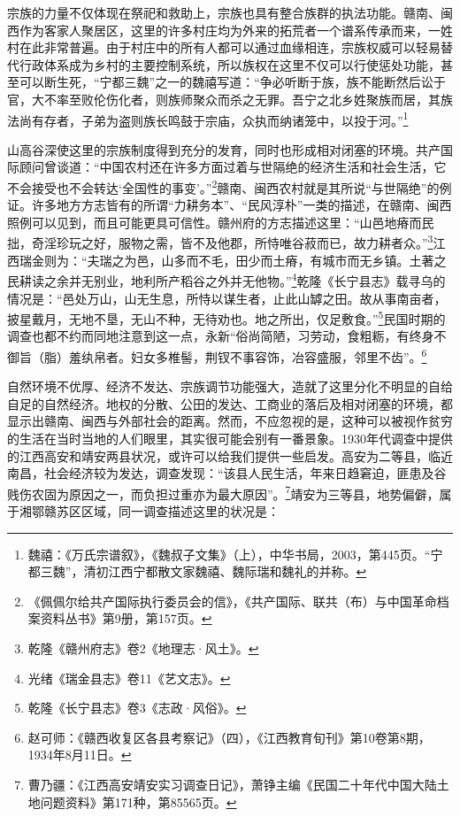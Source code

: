 宗族的力量不仅体现在祭祀和救助上，宗族也具有整合族群的执法功能。赣南、闽西作为客家人聚居区，这里的许多村庄均为外来的拓荒者一个谱系传承而来，一姓村在此非常普遍。由于村庄中的所有人都可以通过血缘相连，宗族权威可以轻易替代行政体系成为乡村的主要控制系统，所以族权在这里不仅可以行使惩处功能，甚至可以断生死，“宁都三魏”之一的魏禧写道：“争必听断于族，族不能断然后讼于官，大不率至败伦伤化者，则族师聚众而杀之无罪。吾宁之北乡姓聚族而居，其族法尚有存者，子弟为盗则族长鸣鼓于宗庙，众执而纳诸笼中，以投于河。”\footnote{魏禧：《万氏宗谱叙》，《魏叔子文集》（上），中华书局，2003，第445页。“宁都三魏”，清初江西宁都散文家魏禧、魏际瑞和魏礼的并称。}


山高谷深使这里的宗族制度得到充分的发育，同时也形成相对闭塞的环境。共产国际顾问曾谈道：“中国农村还在许多方面过着与世隔绝的经济生活和社会生活，它不会接受也不会转达‘全国性的事变’。”\footnote{《佩佩尔给共产国际执行委员会的信》，《共产国际、联共（布）与中国革命档案资料丛书》第9册，第157页。}赣南、闽西农村就是其所说“与世隔绝”的例证。许多地方方志皆有的所谓“力耕务本”、“民风淳朴”一类的描述，在赣南、闽西照例可以见到，而且可能更具可信性。赣州府的方志描述这里：“山邑地瘠而民拙，奇淫珍玩之好，服物之需，皆不及他郡，所恃唯谷菽而已，故力耕者众。”\footnote{乾隆《赣州府志》卷2《地理志·风土》。}江西瑞金则为：“夫瑞之为邑，山多而不毛，田少而土瘠，有城市而无乡镇。土著之民耕读之余并无别业，地利所产稻谷之外并无他物。”\footnote{光绪《瑞金县志》卷11《艺文志》。}乾隆《长宁县志》载寻乌的情况是：“邑处万山，山无生息，所恃以谋生者，止此山罅之田。故从事南亩者，披星戴月，无地不垦，无山不种，无待劝也。地之所出，仅足敷食。”\footnote{乾隆《长宁县志》卷3《志政·风俗》。}民国时期的调查也都不约而同地注意到这一点，永新“俗尚简陋，习劳动，食粗粝，有终身不御旨（脂）羞纨帛者。妇女多椎髻，荆钗不事容饰，冶容盛服，邻里不齿”。\footnote{赵可师：《赣西收复区各县考察记》（四），《江西教育旬刊》第10卷第8期，1934年8月11日。}


自然环境不优厚、经济不发达、宗族调节功能强大，造就了这里分化不明显的自给自足的自然经济。地权的分散、公田的发达、工商业的落后及相对闭塞的环境，都显示出赣南、闽西与外部社会的距离。然而，不应忽视的是，这种可以被视作贫穷的生活在当时当地的人们眼里，其实很可能会别有一番景象。1930年代调查中提供的江西高安和靖安两县状况，或许可以给我们提供一些启发。高安为二等县，临近南昌，社会经济较为发达，调查发现：“该县人民生活，年来日趋窘迫，匪患及谷贱伤农固为原因之一，而负担过重亦为最大原因”。\footnote{曹乃疆：《江西高安靖安实习调查日记》，萧铮主编《民国二十年代中国大陆土地问题资料》第171种，第85565页。}靖安为三等县，地势偏僻，属于湘鄂赣苏区区域，同一调查描述这里的状况是：

